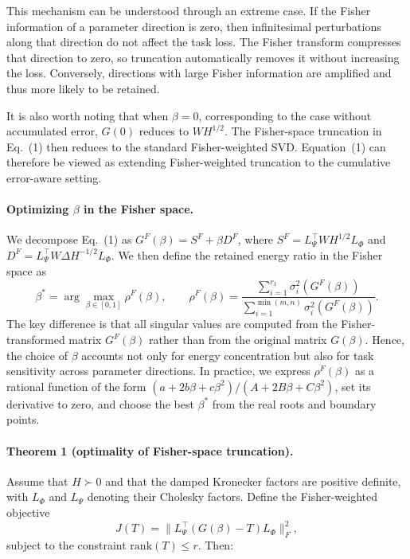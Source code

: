 \documentclass[a4paper,fleqn]{cas-dc}
\begin{document}
This mechanism can be understood through an extreme case. If the Fisher information of a parameter direction is zero, then infinitesimal perturbations along that direction do not affect the task loss. The Fisher transform compresses that direction to zero, so truncation automatically removes it without increasing the loss. Conversely, directions with large Fisher information are amplified and thus more likely to be retained.

It is also worth noting that when $\beta = 0$, corresponding to the case without accumulated error, $G(0)$ reduces to $WH^{1/2}$. The Fisher-space truncation in Eq.~(1) then reduces to the standard Fisher-weighted SVD. Equation~(1) can therefore be viewed as extending Fisher-weighted truncation to the cumulative error-aware setting.

\paragraph{Optimizing $\beta$ in the Fisher space.}
We decompose Eq.~(1) as $G^F(\beta) = S^F + \beta D^F$, where $S^F = L_\Psi^\top W H^{1/2} L_\Phi$ and $D^F = L_\Psi^\top W \Delta H^{-1/2} L_\Phi$. We then define the retained energy ratio in the Fisher space as
\begin{equation}
\beta^* = \arg\max_{\beta \in [0,1]} \rho^F(\beta), \qquad
\rho^F(\beta) = \frac{\sum_{i=1}^{r_1} \sigma_i^2(G^F(\beta))}{\sum_{i=1}^{\min(m,n)} \sigma_i^2(G^F(\beta))}.
\tag{2}
\end{equation}
The key difference is that all singular values are computed from the Fisher-transformed matrix $G^F(\beta)$ rather than from the original matrix $G(\beta)$. Hence, the choice of $\beta$ accounts not only for energy concentration but also for task sensitivity across parameter directions. In practice, we express $\rho^F(\beta)$ as a rational function of the form $(a + 2b\beta + c\beta^2)/(A + 2B\beta + C\beta^2)$, set its derivative to zero, and choose the best $\beta^*$ from the real roots and boundary points.

\paragraph{Theorem 1 (optimality of Fisher-space truncation).}
Assume that $H \succ 0$ and that the damped Kronecker factors are positive definite, with $L_\Phi$ and $L_\Psi$ denoting their Cholesky factors. Define the Fisher-weighted objective
\begin{equation}
J(T) = \|L_\Psi^\top (G(\beta) - T)L_\Phi\|_F^2,
\end{equation}
subject to the constraint $\mathrm{rank}(T) \le r$. Then:
\end{document}

